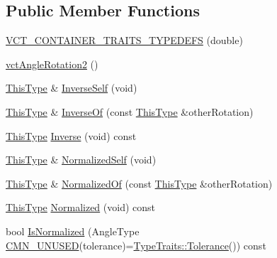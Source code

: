 \subsection*{Public Member Functions}
\begin{DoxyCompactItemize}
\item 
\hyperlink{classvct_angle_rotation2_a1e46485e0de755434c239e3b8d10eebc}{V\+C\+T\+\_\+\+C\+O\+N\+T\+A\+I\+N\+E\+R\+\_\+\+T\+R\+A\+I\+T\+S\+\_\+\+T\+Y\+P\+E\+D\+E\+F\+S} (double)
\item 
\hyperlink{classvct_angle_rotation2_a82335f217a852c3a9abac0f0c5766286}{vct\+Angle\+Rotation2} ()
\item 
\hyperlink{classvct_angle_rotation2_a67339254f084f89c13aca70c1242d18e}{This\+Type} \& \hyperlink{classvct_angle_rotation2_a16c50a586a3f30702d45eb7db7ae0f48}{Inverse\+Self} (void)
\item 
\hyperlink{classvct_angle_rotation2_a67339254f084f89c13aca70c1242d18e}{This\+Type} \& \hyperlink{classvct_angle_rotation2_a31299d9b956651c84b284c8951480e89}{Inverse\+Of} (const \hyperlink{classvct_angle_rotation2_a67339254f084f89c13aca70c1242d18e}{This\+Type} \&other\+Rotation)
\item 
\hyperlink{classvct_angle_rotation2_a67339254f084f89c13aca70c1242d18e}{This\+Type} \hyperlink{classvct_angle_rotation2_af20c0aeb44ed810060eac9c068cac40f}{Inverse} (void) const 
\item 
\hyperlink{classvct_angle_rotation2_a67339254f084f89c13aca70c1242d18e}{This\+Type} \& \hyperlink{classvct_angle_rotation2_a88280cb00aa3ed012e4c30690f7a509e}{Normalized\+Self} (void)
\item 
\hyperlink{classvct_angle_rotation2_a67339254f084f89c13aca70c1242d18e}{This\+Type} \& \hyperlink{classvct_angle_rotation2_a30a34d99f9b530eedede7c7ff664941f}{Normalized\+Of} (const \hyperlink{classvct_angle_rotation2_a67339254f084f89c13aca70c1242d18e}{This\+Type} \&other\+Rotation)
\item 
\hyperlink{classvct_angle_rotation2_a67339254f084f89c13aca70c1242d18e}{This\+Type} \hyperlink{classvct_angle_rotation2_afb448f3b070001d1afd4d98b49ab2b47}{Normalized} (void) const 
\item 
bool \hyperlink{classvct_angle_rotation2_a11736c57bdb0c868dee69540e6142758}{Is\+Normalized} (Angle\+Type \hyperlink{cmn_portability_8h_a021894e2626935fa2305434b1e893ff6}{C\+M\+N\+\_\+\+U\+N\+U\+S\+E\+D}(tolerance)=\hyperlink{classcmn_type_traits_adc129bf9867295b90d300768b780fa99}{Type\+Traits\+::\+Tolerance}()) const 
\item 

\end{DoxyCompactItemize}
